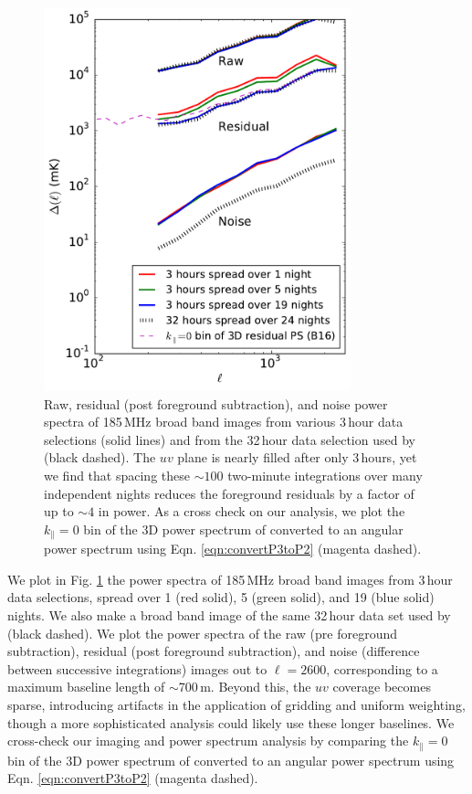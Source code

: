 \documentclass[numberedappendix]{emulateapj}
\begin{document}
\begin{figure}[h]
\centering
\includegraphics[width=3.5in]{res_pspec_of_100_obsids_with_diff_spacings_6amin_delta.pdf}
\caption[Raw, residual (post foreground subtraction), and noise power spectra of 185\,MHz broad band images from various data selections.]{Raw, residual (post foreground subtraction), and noise power spectra of 185\,MHz broad band images from various 3\,hour data selections (solid lines) and from the 32\,hour data selection used by  \citet{beardsley16} (black dashed). The $uv$ plane is nearly filled after only 3\,hours, yet we find that spacing these $\sim100$ two-minute integrations over many independent nights reduces the foreground residuals by a factor of up to $\sim4$ in power. As a cross check on our analysis, we plot the $k_\parallel=0$ bin of the 3D power spectrum of \citet{beardsley16} converted to an angular power spectrum using Eqn. \ref{eqn:convertP3toP2} (magenta dashed).}
\label{fig:respspecspacingsstudy}
\end{figure}

We plot in Fig. \ref{fig:respspecspacingsstudy} the power spectra of 185\,MHz broad band images from  3\,hour data selections, spread over 1 (red solid), 5 (green solid), and 19 (blue solid) nights. We also make a broad band image of the same 32\,hour data set used by \citet{beardsley16} (black dashed). We plot the power spectra of the raw (pre foreground subtraction), residual (post foreground subtraction), and noise (difference between successive integrations) images out to $\ell=2600$, corresponding to a maximum baseline length of $\sim$700\,m. Beyond this, the $uv$ coverage becomes sparse, introducing artifacts in the application of gridding and uniform weighting, though a more sophisticated analysis could likely use these longer baselines. We cross-check our imaging and power spectrum analysis by comparing the  $k_\parallel=0$ bin of the 3D power spectrum of \citet{beardsley16} converted to an angular power spectrum using Eqn. \ref{eqn:convertP3toP2} (magenta dashed). 
\end{document}
